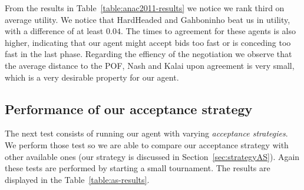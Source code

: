 From the results in Table~\ref{table:anac2011-results} we notice we rank third on average utility. 
We notice that HardHeaded and Gahboninho beat us in utility, with a difference of at least $0.04$. The times to agreement for these agents is also higher,
indicating that our agent might accept bids too fast or is conceding too fast in the last phase.
Regarding the effiency of the negotiation we observe that the average distance to the POF, Nash and Kalai upon agreement is very small,
which is a very desirable property for our agent. 

\subsection{Performance of our acceptance strategy}

The next test consists of running our agent with varying \emph{acceptance strategies}. We perform those test so we are able to compare our acceptance strategy with other available ones (our strategy is discussed in Section~\ref{sec:strategyAS}). Again these tests are performed by starting a small tournament. The results are displayed in the Table~\ref{table:as-results}. 

